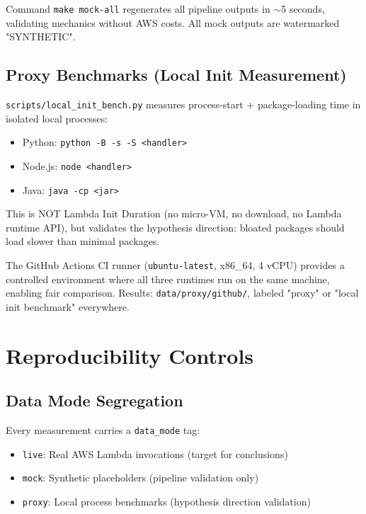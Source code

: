 Command \texttt{make mock-all} regenerates all pipeline outputs in $\sim$5 seconds, validating mechanics without AWS costs. All mock outputs are watermarked "SYNTHETIC".

\subsection{Proxy Benchmarks (Local Init Measurement)}

\texttt{scripts/local\_init\_bench.py} measures process-start + package-loading time in isolated local processes:

\begin{itemize}
    \item Python: \texttt{python -B -s -S <handler>}
    \item Node.js: \texttt{node <handler>}
    \item Java: \texttt{java -cp <jar>}
\end{itemize}

This is NOT Lambda Init Duration (no micro-VM, no download, no Lambda runtime API), but validates the hypothesis direction: bloated packages should load slower than minimal packages.

The GitHub Actions CI runner (\texttt{ubuntu-latest}, x86\_64, 4 vCPU) provides a controlled environment where all three runtimes run on the same machine, enabling fair comparison. Results: \texttt{data/proxy/github/}, labeled "proxy" or "local init benchmark" everywhere.

\section{Reproducibility Controls}

\subsection{Data Mode Segregation}

Every measurement carries a \texttt{data\_mode} tag:
\begin{itemize}
    \item \texttt{live}: Real AWS Lambda invocations (target for conclusions)
    \item \texttt{mock}: Synthetic placeholders (pipeline validation only)
    \item \texttt{proxy}: Local process benchmarks (hypothesis direction validation)
\end{itemize}

